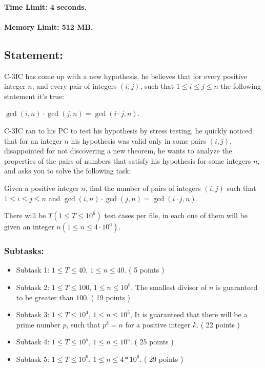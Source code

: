 \hypertarget{time-limit-4-seconds.}{%
\paragraph{Time Limit: 4 seconds.}\label{time-limit-4-seconds.}}

\hypertarget{memory-limit-512-mb.}{%
\paragraph{Memory Limit: 512 MB.}\label{memory-limit-512-mb.}}

\hypertarget{statement}{%
\subsection{Statement:}\label{statement}}

C-3IC has come up with a new hypothesis, he believes that for every
positive integer \(n\), and every pair of integers \((i, j)\), such that
\(1 \leq i \leq j \leq n\) the following statement it's true:

\(\gcd {(i, n)} \cdot \gcd {(j, n)} = \gcd {(i \cdot j, n)}\).

C-3IC ran to his PC to test his hypothesis by stress testing, he quickly
noticed that for an integer \(n\) his hypothesis was valid only in some
pairs \((i, j)\), disappointed for not discovering a new theorem, he
wants to analyze the properties of the pairs of numbers that satisfy his
hypothesis for some integers \(n\), and asks you to solve the following
task:

Given a positive integer \(n\), find the number of pairs of integers
\((i, j)\) such that \(1 \leq i \leq j \leq n\) and
\(\gcd {(i, n)} \cdot \gcd {(j , n)} = \gcd {(i \cdot j, n)}\).

There will be \(T (1 \leq T \leq 10 ^ 6)\) test cases per file, in each
one of them will be given an integer
\(n (1 \leq n \leq 4 \cdot 10 ^ 6)\).

\hypertarget{subtasks}{%
\subsubsection{Subtasks:}\label{subtasks}}

\begin{itemize}
\item
  Subtask 1: \(1 \leq T \leq 40\), \(1 \leq n \leq 40\). ( 5 points )
\item
  Subtask 2: \(1 \leq T \leq 100\), \(1 \leq n \leq 10 ^ 5\), The
  smallest divisor of \(n\) is guaranteed to be greater than \(100\). (
  19 points )
\item
  Subtask 3: \(1 \leq T \leq 10^4\), \(1 \leq n \leq 10 ^ 5\), It is
  guaranteed that there will be a prime number \(p\), such that
  \(p^k = n\) for a positive integer \(k\). ( 22 points )
\item
  Subtask 4: \(1 \leq T \leq 10 ^ 5\), \(1 \leq n \leq 10 ^ 5\). ( 25
  points )
\item
  Subtask 5: \(1 \leq T \leq 10 ^ 6\), \(1 \leq n \leq 4 * 10 ^ 6\). (
  29 points )
\end{itemize}

